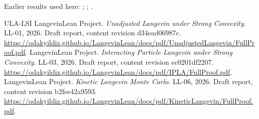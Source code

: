 \documentclass[11pt,a4paper]{article}
\begin{document}
Earlier results used here: \cite[Section~3.20.3]{LangevinLean2026ULASC}; \cite[Section~3.1.1]{LangevinLean2026IPLA}; \cite[Section~3.112.3]{LangevinLean2026Kinetic}.

\begin{thebibliography}{ULA-LSI}
LangevinLean Project. \emph{Unadjusted Langevin under Strong Convexity}. LL-01, 2026. Draft report, content revision d34ead06987c. \url{https://odakyildiz.github.io/LangevinLean/docs/pdf/UnadjustedLangevin/FullProof.pdf}.
LangevinLean Project. \emph{Interacting Particle Langevin under Strong Convexity}. LL-03, 2026. Draft report, content revision ec0201df2207. \url{https://odakyildiz.github.io/LangevinLean/docs/pdf/IPLA/FullProof.pdf}.
LangevinLean Project. \emph{Kinetic Langevin Monte Carlo}. LL-06, 2026. Draft report, content revision b2fee42a9593. \url{https://odakyildiz.github.io/LangevinLean/docs/pdf/KineticLangevin/FullProof.pdf}.
\end{thebibliography}
\end{document}
